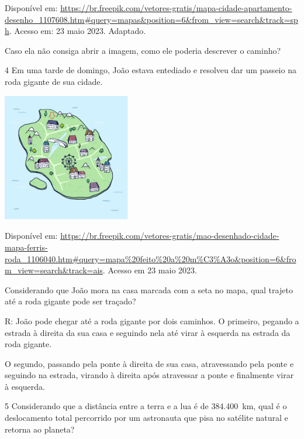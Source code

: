 {Disponível em:
\url{https://br.freepik.com/vetores-gratis/mapa-cidade-apartamento-desenho_1107608.htm\#query=mapas\&position=6\&from_view=search\&track=sph}.
Acesso em: 23 maio 2023. Adaptado.

Caso ela não consiga abrir a imagem, como ele poderia descrever o
caminho?


\num{4} Em uma tarde de domingo, João estava entediado e resolveu dar um
passeio na roda gigante de sua cidade.

\includegraphics[width=2.2in,height=2.2in]{./imgSAEB_8_MAT/media/image38.png}

Disponível em:
\url{https://br.freepik.com/vetores-gratis/mao-desenhado-cidade-mapa-ferris-roda_1106040.htm\#query=mapa\%20feito\%20a\%20m\%C3\%A3o\&position=6\&from_view=search\&track=ais}.
Acesso em 23 maio 2023.

Considerando que João mora na casa marcada com a seta no mapa, qual
trajeto até a roda gigante pode ser traçado?

R: João pode chegar até a roda gigante por dois caminhos. O primeiro,
pegando a estrada à direita da sua casa e seguindo nela até virar à
esquerda na estrada da roda gigante.

O segundo, passando pela ponte à direita de sua casa, atravessando pela
ponte e seguindo na estrada, virando à direita após atravessar a ponte e
finalmente virar à esquerda.

\num{5} Considerando que a distância entre a terra e a lua é de 384.400~km,
qual é o deslocamento total percorrido por um astronauta que pisa no
satélite natural e retorna ao planeta?


}
